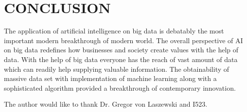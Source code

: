 \documentclass[sigconf]{acmart}
\begin{document}
\section{CONCLUSION}
The application of artificial intelligence on big data is debatably the most important modern breakthrough of modern world. The overall perspective of AI on big data redefines how businesses and society create values with the help of data. With the help of big data everyone has the reach of vast amount of data which can readily help supplying valuable information. The obtainability of massive data set with implementation of machine learning along with a sophisticated algorithm provided a breakthrough of contemporary innovation. 

\begin{acks}

  The author would like to thank Dr. Gregor von Laszewski and I523.

\end{acks}



 


\end{document}
